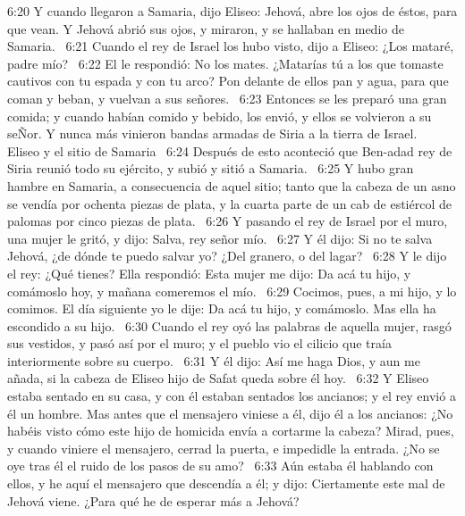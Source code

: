 6:20 Y cuando llegaron a Samaria, dijo Eliseo: Jehová, abre los ojos de éstos, para que vean. Y Jehová abrió sus ojos, y miraron, y se hallaban en medio de Samaria.  
6:21 Cuando el rey de Israel los hubo visto, dijo a Eliseo: ¿Los mataré, padre mío?  
6:22 El le respondió: No los mates. ¿Matarías tú a los que tomaste cautivos con tu espada y con tu arco? Pon delante de ellos pan y agua, para que coman y beban, y vuelvan a sus señores.  
6:23 Entonces se les preparó una gran comida; y cuando habían comido y bebido, los envió, y ellos se volvieron a su seÑor. Y nunca más vinieron bandas armadas de Siria a la tierra de Israel.  
Eliseo y el sitio de Samaria  
6:24 Después de esto aconteció que Ben-adad rey de Siria reunió todo su ejército, y subió y sitió a Samaria.  
6:25 Y hubo gran hambre en Samaria, a consecuencia de aquel sitio; tanto que la cabeza de un asno se vendía por ochenta piezas de plata, y la cuarta parte de un cab de estiércol de palomas por cinco piezas de plata.  
6:26 Y pasando el rey de Israel por el muro, una mujer le gritó, y dijo: Salva, rey señor mío.  
6:27 Y él dijo: Si no te salva Jehová, ¿de dónde te puedo salvar yo? ¿Del granero, o del lagar?  
6:28 Y le dijo el rey: ¿Qué tienes? Ella respondió: Esta mujer me dijo: Da acá tu hijo, y comámoslo hoy, y mañana comeremos el mío.  
6:29 Cocimos, pues, a mi hijo, y lo comimos. El día siguiente yo le dije: Da acá tu hijo, y comámoslo. Mas ella ha escondido a su hijo.  
6:30 Cuando el rey oyó las palabras de aquella mujer, rasgó sus vestidos, y pasó así por el muro; y el pueblo vio el cilicio que traía interiormente sobre su cuerpo.  
6:31 Y él dijo: Así me haga Dios, y aun me añada, si la cabeza de Eliseo hijo de Safat queda sobre él hoy.  
6:32 Y Eliseo estaba sentado en su casa, y con él estaban sentados los ancianos; y el rey envió a él un hombre. Mas antes que el mensajero viniese a él, dijo él a los ancianos: ¿No habéis visto cómo este hijo de homicida envía a cortarme la cabeza? Mirad, pues, y cuando viniere el mensajero, cerrad la puerta, e impedidle la entrada. ¿No se oye tras él el ruido de los pasos de su amo?  
6:33 Aún estaba él hablando con ellos, y he aquí el mensajero que descendía a él; y dijo: Ciertamente este mal de Jehová viene. ¿Para qué he de esperar más a Jehová?  

